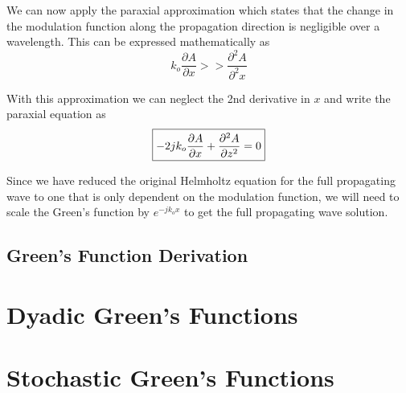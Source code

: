  We can now apply the paraxial approximation which states that the change in the modulation function along the propagation direction is negligible over a wavelength. This can be expressed mathematically as
  \begin{equation}
k_o\frac{\partial A}{\partial x} >> \frac{\partial^2 A}{\partial^2 x}
\label{gf_eq:43}
\end{equation}
 \renewcommand{\baselinestretch}{2} \small\normalsize
 
 With this approximation we can neglect the 2nd derivative in $x$ and write the paraxial equation as
   \begin{equation}
\boxed{-2jk_o\frac{\partial A}{\partial x} + \frac{\partial^2 A}{\partial z^2} = 0} \\
\label{gf_eq:44}
\end{equation}
 \renewcommand{\baselinestretch}{2} \small\normalsize
 
Since we have reduced the original Helmholtz equation for the full propagating wave to one that is only dependent on the modulation function, we will need to scale the Green's function by $e^{-jk_ox}$ to get the full propagating wave solution.
 
\subsection{Green's Function Derivation}
 
\section{Dyadic Green's Functions}


\section{Stochastic Green's Functions}


